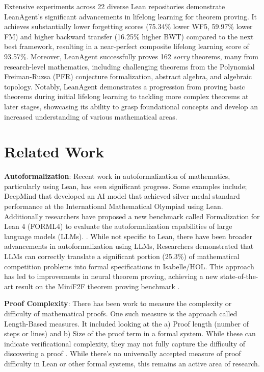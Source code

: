 \documentclass{article} %
\begin{document}
Extensive experiments across 22 diverse Lean repositories demonstrate LeanAgent's significant advancements in lifelong learning for theorem proving. It achieves substantially lower forgetting scores (75.34\% lower WF5, 59.97\% lower FM) and higher backward transfer (16.25\% higher BWT) compared to the next best framework, resulting in a near-perfect composite lifelong learning score of 93.57\%. Moreover, LeanAgent successfully proves 162 \textit{sorry} theorems, many from research-level mathematics, including challenging theorems from the Polynomial Freiman-Ruzsa (PFR) conjecture formalization, abstract algebra, and algebraic topology. Notably, LeanAgent demonstrates a progression from proving basic theorems during initial lifelong learning to tackling more complex theorems at later stages, showcasing its ability to grasp foundational concepts and develop an increased understanding of various mathematical areas.


\section{Related Work}


\textbf{Autoformalization}: Recent work in autoformalization of mathematics, particularly using Lean, has seen significant progress. Some examples include; DeepMind that developed an AI model that achieved silver-medal standard performance at the International Mathematical Olympiad using Lean. Additionally researchers have proposed a new benchmark called Formalization for Lean 4 (FORML4) to evaluate the autoformalization capabilities of large language models (LLMs).
\citep{lu2024processdrivenautoformalizationlean4}. While not specific to Lean, there have been broader advancements in autoformalization using LLMs, Researchers demonstrated that LLMs can correctly translate a significant portion (25.3\%) of mathematical competition problems into formal specifications in Isabelle/HOL. This approach has led to improvements in neural theorem proving, achieving a new state-of-the-art result on the MiniF2F theorem proving benchmark \citep{wu2022autoformalizationlargelanguagemodels}.

\textbf{Proof Complexity}: There has been work to measure the complexity or difficulty of mathematical proofs. One such measure is the approach called Length-Based measures. It included looking at the a) Proof length (number of steps or lines) and b) Size of the proof term in a formal system. While these can indicate verificational complexity, they may not fully capture the difficulty of discovering a proof \citep{Arana2023-ARAOTD-3}. While there's no universally accepted measure of proof difficulty in Lean or other formal systems, this remains an active area of research. 
\end{document}
